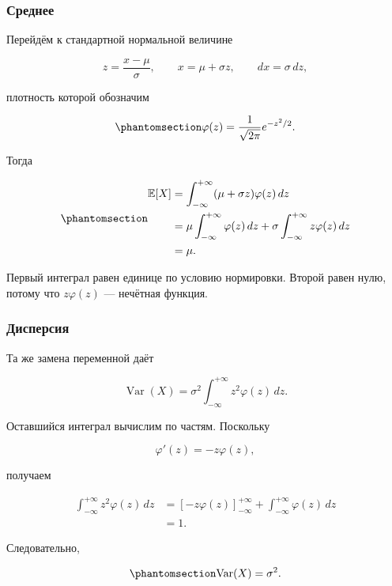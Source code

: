 \documentclass[
  russian,
  11pt,
  a4paper,
  open=any]{scrbook}
\begin{document}
\begin{bookderivation}

\subsubsection{Среднее}\label{ux441ux440ux435ux434ux43dux435ux435-2}

Перейдём к стандартной нормальной величине

\[
z=\frac{x-\mu}{\sigma},
\qquad
x=\mu+\sigma z,
\qquad
dx=\sigma\,dz,
\]

плотность которой обозначим

\begin{equation}\protect\phantomsection\label{eq-standard-normal-density}{
\varphi(z)=\frac{1}{\sqrt{2\pi}}e^{-z^2/2}.
}\end{equation}

Тогда

\begin{equation}\protect\phantomsection\label{eq-normal-mean}{
\begin{aligned}
\mathbb E[X]
&=\int_{-\infty}^{+\infty}(\mu+\sigma z)\varphi(z)\,dz\\
&=\mu\int_{-\infty}^{+\infty}\varphi(z)\,dz
+\sigma\int_{-\infty}^{+\infty}z\varphi(z)\,dz\\
&=\mu.
\end{aligned}
}\end{equation}

Первый интеграл равен единице по условию нормировки. Второй равен нулю,
потому что \(z\varphi(z)\) --- нечётная функция.

\end{bookderivation}

\begin{bookderivation}

\subsubsection{Дисперсия}\label{ux434ux438ux441ux43fux435ux440ux441ux438ux44f-3}

Та же замена переменной даёт

\[
\operatorname{Var}(X)
=\sigma^2\int_{-\infty}^{+\infty}z^2\varphi(z)\,dz.
\]

Оставшийся интеграл вычислим по частям. Поскольку

\[
\varphi'(z)=-z\varphi(z),
\]

получаем

\[
\begin{aligned}
\int_{-\infty}^{+\infty}z^2\varphi(z)\,dz
&=\left[-z\varphi(z)\right]_{-\infty}^{+\infty}
+\int_{-\infty}^{+\infty}\varphi(z)\,dz\\
&=1.
\end{aligned}
\]

Следовательно,

\begin{equation}\protect\phantomsection\label{eq-normal-variance}{
\operatorname{Var}(X)=\sigma^2.
}\end{equation}

\end{bookderivation}
\end{document}
